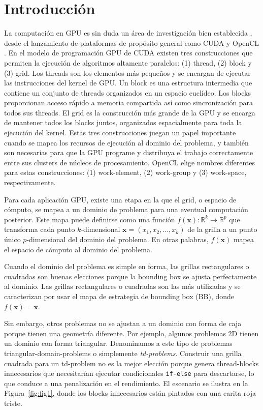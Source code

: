 \documentclass[twocolumn,10pt,a4paper]{article}
\begin{document}
\section{Introducción}
\label{sec:introduction}

La computación en GPU es sin duda un área de investigación bien establecida
\cite{ref14,ref11,ref2}, desde el lanzamiento de plataformas de propósito
general como CUDA \cite{ref12} y OpenCL \cite{ref7}. En el modelo de
programación GPU de CUDA existen tres construcciones que permiten la ejecución
de algoritmos altamente paralelos: (1) thread, (2) block y (3) grid. Los
threads son los elementos más pequeños y se encargan de ejecutar las
instrucciones del kernel de GPU. Un block es una estructura intermedia que
contiene un conjunto de threads organizados en un espacio euclídeo. Los blocks
proporcionan acceso rápido a memoria compartida así como sincronización para
todos sus threads. El grid es la construcción más grande de la GPU y se encarga
de mantener todos los blocks juntos, organizados espacialmente para toda la
ejecución del kernel. Estas tres construcciones juegan un papel importante
cuando se mapea los recursos de ejecución al dominio del problema, y también
son necesarias para que la GPU programe y distribuya el trabajo correctamente
entre sus clusters de núcleos de procesamiento. OpenCL elige nombres
diferentes para estas construcciones: (1) work-element, (2) work-group y (3)
work-space, respectivamente.

Para cada aplicación GPU, existe una etapa en la que el grid, o espacio de
cómputo, se mapea a un dominio de problema para una eventual computación
posterior. Este mapa puede definirse como una función
$f(\mathbf{x}) : \mathbb{R}^k \rightarrow \mathbb{R}^p$
que transforma cada punto $k$-dimensional
$\mathbf{x} = (x_1, x_2, \ldots, x_k)$ de la grilla a un punto único
$p$-dimensional del dominio del problema. En otras palabras, $f(\mathbf{x})$
mapea el espacio de cómputo al dominio del problema.

Cuando el dominio del problema es simple en forma, las grillas rectangulares o
cuadradas son buenas elecciones porque la bounding box se ajusta perfectamente
al dominio. Las grillas rectangulares o cuadradas son las más utilizadas y se
caracterizan por usar el mapa de estrategia de bounding box (BB), donde
$f(\mathbf{x}) = \mathbf{x}$.

Sin embargo, otros problemas no se ajustan a un dominio con forma de caja
porque tienen una geometría diferente. Por ejemplo, algunos problemas 2D tienen
un dominio con forma triangular. Denominamos a este tipo de problemas
triangular-domain-problems o simplemente \emph{td-problems}. Construir una
grilla cuadrada para un td-problem no es la mejor elección porque genera
thread-blocks innecesarios que necesitarían ejecutar condicionales
\texttt{if-else} para descartarse, lo que conduce a una penalización en el
rendimiento. El escenario se ilustra en la Figura~\ref{fig:fig1}, donde los
blocks innecesarios están pintados con una carita roja triste.
\end{document}
